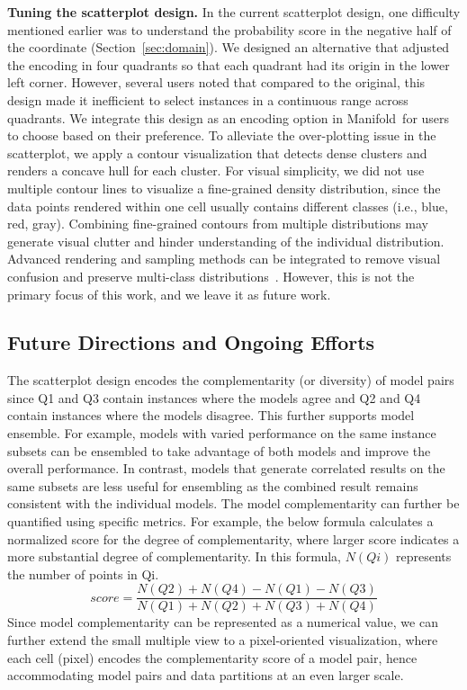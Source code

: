 \documentclass[preprint,journal]{vgtc}       %
\newcommand{\techname}{Manifold}
\begin{document}
\textbf{Tuning the scatterplot design.} In the current scatterplot design, one difficulty mentioned earlier was to understand the probability score in the negative half of the coordinate (Section~\ref{sec:domain}). We designed an alternative that adjusted the encoding in four quadrants so that each quadrant had its origin in the lower left corner. However, several users noted that compared to the original, this design made it inefficient to select instances in a continuous range across quadrants. We integrate this design as an encoding option in \techname\ for users to choose based on their preference. To alleviate the over-plotting issue in the scatterplot, we apply a contour visualization that detects dense clusters and renders a concave hull for each cluster. For visual simplicity, we did not use multiple contour lines to visualize a fine-grained density distribution, since the data points rendered within one cell usually contains different classes (i.e., blue, red, gray). Combining fine-grained contours from multiple distributions may generate visual clutter and hinder understanding of the individual distribution. Advanced rendering and sampling methods can be integrated to remove visual confusion and preserve multi-class distributions~\cite{chen2014visual,mayorga2013splatterplots}. However, this is not the primary focus of this work, and we leave it as future work.

\color{black}
\subsection{Future Directions and Ongoing Efforts}
The scatterplot design encodes the complementarity (or diversity) of model pairs since Q1 and Q3 contain instances where the models agree and Q2 and Q4 contain instances where the models disagree. This further supports model ensemble. For example, models with varied performance on the same instance subsets can be ensembled to take advantage of both models and improve the overall performance. In contrast, models that generate correlated results on the same subsets are less useful for ensembling as the combined result remains consistent with the individual models. The model complementarity can further be quantified using specific metrics. For example, the below formula calculates a normalized score for the degree of complementarity, where larger score indicates a more substantial degree of complementarity. In this formula, $N(Qi)$ represents the number of points in Qi.
\[
    score = \frac{N(Q2) + N(Q4) - N(Q1) - N(Q3)}{N(Q1) + N(Q2) + N(Q3) + N(Q4)}
\]
Since model complementarity can be represented as a numerical value, we can further extend the small multiple view to a pixel-oriented visualization, where each cell (pixel) encodes the complementarity score of a model pair, hence accommodating model pairs and data partitions at an even larger scale.
\end{document}
